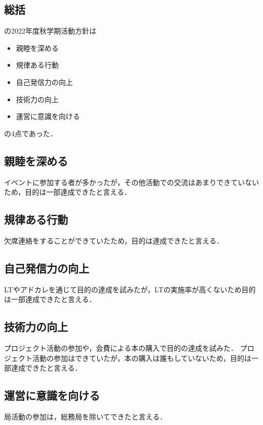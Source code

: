\subsection*{\firstGrade{}総括}


\firstGrade{}の2022年度秋学期活動方針は
\begin{itemize}
    \item 親睦を深める
    \item 規律ある行動
    \item 自己発信力の向上
    \item 技術力の向上
    \item 運営に意識を向ける
\end{itemize}
の4点であった．

\subsection*{親睦を深める}
イベントに参加する者が多かったが，その他活動での交流はあまりできていないため，目的は一部達成できたと言える．

\subsection*{規律ある行動}
欠席連絡をすることができていたため，目的は達成できたと言える．

\subsection*{自己発信力の向上}
LTやアドカレを通じて目的の達成を試みたが，LTの実施率が高くないため目的は一部達成できたと言える．

\subsection*{技術力の向上}
プロジェクト活動の参加や，会費による本の購入で目的の達成を試みた．
プロジェクト活動の参加はできていたが，本の購入は誰もしていないため，目的は一部達成できたと言える．

\subsection*{運営に意識を向ける}
局活動の参加は，総務局を除いてできたと言える．

